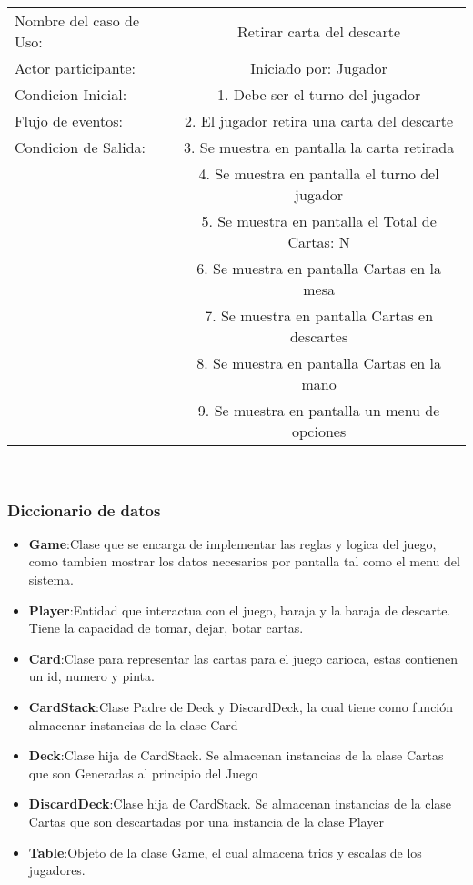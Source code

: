 \begin{center}
    \begin{tabular}{ l | c  }
        Nombre del caso de Uso: & Retirar carta del descarte                      \\
        Actor participante:     & Iniciado por: Jugador                           \\\hline
        Condicion Inicial:      & 1. Debe ser el turno del jugador                \\
        Flujo de eventos:       & 2. El jugador retira una carta del descarte     \\\hline
        Condicion de Salida:    & 3. Se muestra en pantalla la carta retirada     \\
                                & 4. Se muestra en pantalla el turno del jugador  \\
                                & 5. Se muestra en pantalla el Total de Cartas: N \\
                                & 6. Se muestra en pantalla Cartas en la mesa     \\
                                & 7. Se muestra en pantalla Cartas en descartes   \\
                                & 8. Se muestra en pantalla Cartas en la mano     \\
                                & 9. Se muestra en pantalla un menu de opciones   \\ 
    \end{tabular} \\
\end{center}


\subsubsection{Diccionario de datos}\label{cap:diccionario-datos}
\begin{itemize}
    \item\textbf{Game}:Clase que se encarga de implementar las reglas y logica del juego, \\como tambien mostrar los datos necesarios por pantalla tal como el menu del sistema. 
    \item\textbf{Player}:Entidad que interactua con el juego, baraja y la baraja de descarte. Tiene la capacidad de tomar, dejar, botar cartas.
    \item\textbf{Card}:Clase para representar las cartas para el juego carioca, estas contienen un id, numero y pinta.
    \item\textbf{CardStack}:Clase Padre de Deck y DiscardDeck, la cual tiene como función almacenar instancias de la clase Card
    \item\textbf{Deck}:Clase hija de CardStack. Se almacenan instancias de la clase Cartas que son Generadas al principio del Juego
    \item\textbf{DiscardDeck}:Clase hija de CardStack. Se almacenan instancias de la clase Cartas que son descartadas por una instancia de la clase Player
    \item\textbf{Table}:Objeto de la clase Game, el cual almacena trios y escalas de los jugadores. 
\end{itemize}
\clearpage
